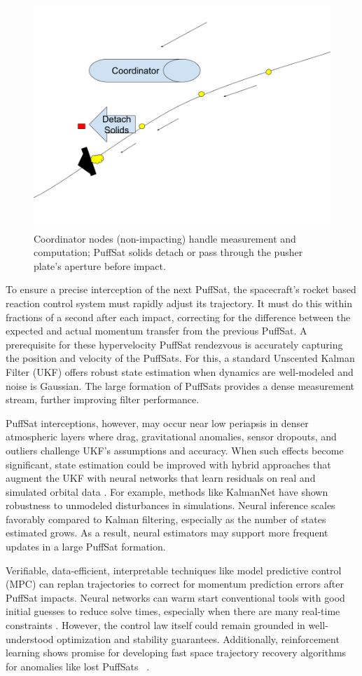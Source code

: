 \documentclass{article}
\begin{document}
\begin{figure}[htpb]
    \centering
    \includegraphics[width=0.5\linewidth]{images/Coordinator Nodes.png}
    \caption{Coordinator nodes (non-impacting) handle measurement and computation; PuffSat solids detach or pass through the pusher plate's aperture before impact.}
    \label{fig:coordinator-nodes}
\end{figure} 

To ensure a precise interception of the next PuffSat, the spacecraft's rocket based reaction control system must rapidly adjust its trajectory. It must do this within fractions of a second after each impact, correcting for the difference between the expected and actual momentum transfer from the previous PuffSat.  A prerequisite for these hypervelocity PuffSat rendezvous is accurately capturing the position and velocity of the PuffSats.  For this, a standard Unscented Kalman Filter (UKF) \cite{wan2000unscented} offers robust state estimation when dynamics are well-modeled and noise is Gaussian.  The large formation of PuffSats provides a dense measurement stream, further improving filter performance.  

PuffSat interceptions, however, may occur near low periapsis in denser atmospheric layers where drag, gravitational anomalies, sensor dropouts, and outliers challenge UKF's assumptions and accuracy.  When such effects become significant, state estimation could be improved with hybrid approaches that augment the UKF with neural networks that learn residuals on real and simulated orbital data \cite{takigawa2023comparison}.  For example, methods like KalmanNet \cite{revach_2022_kalmannet} \cite{revach2022unsupervised} have shown robustness to unmodeled disturbances in simulations.  Neural inference scales favorably compared to Kalman filtering, especially as the number of states estimated grows.  As a result, neural estimators may support more frequent updates in a large PuffSat formation.  

Verifiable, data-efficient, interpretable techniques like model predictive control (MPC) can replan trajectories to correct for momentum prediction errors after PuffSat impacts.  Neural networks can  warm start conventional tools with good initial guesses to reduce solve times, \cite{guffanti2024transformerstrajectoryoptimizationapplication} especially when there are many real-time constraints  \cite{briden_constraint}.  However, the control law itself could remain grounded in well-understood optimization and stability guarantees.     Additionally, reinforcement learning shows promise for developing fast space trajectory recovery algorithms for anomalies like lost PuffSats \ \cite{zavoli2021reinforcement}.  
\end{document}

